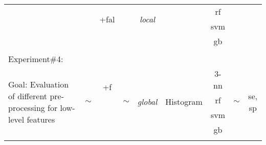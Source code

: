 \begin{landscape}
\begin{table}[ht]
{\begin{center}
{\begin{tabular}{l  c	 c  c  c  c  c  c  c }
 & & \multirow{2}{*}{+\acs{fal}} & & \multirow{2}{*}{\emph{local}} &  & \ac{rf} & & \\
 & & & & & & \ac{svm} & & \\
 & & & & & & \ac{gb} & & \\
\midrule
\\
Experiment\#4:\\
\multirow{4}{4cm}{Goal: Evaluation of different pre-processing for low-level features} & \multirow{4}{*}{$\sim$} & \multirow{2}{*}{ +\acs{f}} & \multirow{4}{*}{$\sim$} & \multirow{4}{*}{\emph{global}} & \multirow{4}{*}{Histogram} & $3$-\ac{nn} & \multirow{4}{*}{$\sim$} & \multirow{4}{*}{\ac{se}, \ac{sp}}\\
& & \multirow{2}{*}{+\ac{fal}} & & & & \ac{rf} &  &\\
& & & & & & \ac{svm} & & \\
& & & & & & \ac{gb} & & \\
\\
\bottomrule


\end{tabular}}
\end{center}}
\label{tab:experiment_summary}
\end{table}
\end{landscape}
